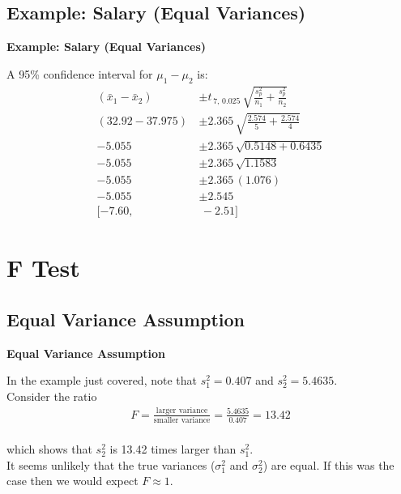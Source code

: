 \documentclass[compress]{beamer}        %
\makeatletter
\newcommand{\tcb}{\textcolor{beamer@blendedblue}}
\makeatother
\begin{document}
\subsection{Example: Salary (Equal Variances)}
\begin{frame}{\bf \tcb{Example: Salary (Equal Variances)}}

A 95\% confidence interval for $\mu_1-\mu_2$ is:
\begin{align*}
(\bar x_1 - \bar x_2) \, &\pm t_{\,7,\,0.025}\,\sqrt{\frac{s_p^2}{n_1}+\frac{s_p^2}{n_2}}\\[0.3cm]
(32.92 - 37.975) \, &\pm 2.365\,\sqrt{\frac{2.574}{5}+\frac{2.574}{4}}\\[0.3cm]
-5.055 \, &\pm 2.365\,\sqrt{0.5148+0.6435}\\[0.2cm]
-5.055 \, &\pm 2.365\,\sqrt{1.1583}\\[0.2cm]
-5.055 \, &\pm 2.365\,(1.076)\\[0.2cm]
-5.055 \, &\pm 2.545 \\[0.2cm]
[-7.60,&\, -2.51]
\end{align*}

\end{frame}




\section{F Test}
\subsection{Equal Variance Assumption}
\begin{frame}{\bf \tcb{Equal Variance Assumption}}

In the example just covered, note that $s_1^2 = 0.407$ and $s_2^2 = 5.4635$.\\[0.9cm]

Consider the ratio
\begin{align*}
F = \frac{\text{larger variance}}{\text{smaller variance}} = \frac{5.4635}{0.407} = 13.42\\[-0.2cm]
\end{align*}

which shows that $s_2^2$ is 13.42 times larger than $s_1^2$.\\[0.9cm]

It seems unlikely that the true variances ($\sigma_1^2$ and $\sigma_2^2$) are equal. If this was the case then we would expect $F \approx 1$.

\end{frame}
\end{document}
